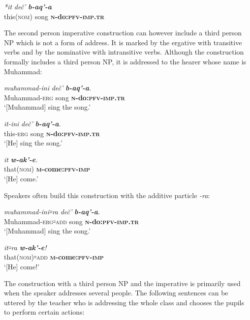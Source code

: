 ﻿\documentclass[output=paper]{langsci/langscibook}
\begin{document}
\ex %
\gll  \emph{*it}  \emph{deč'}  \emph{\textbf{b-aq'-a}}\\
 this(\textsc{nom})  song  \textbf{\textsc{n}-do:\textsc{pfv}-\textsc{imp}.\textsc{tr}}\\
\z
 
The second person imperative construction can however include a third
person {NP} which is not a form of address. It is marked by the ergative
with transitive verbs and by the nominative with intransitive verbs.
Although the construction formally includes a third person {NP}, it is
addressed to the hearer whose name is Muhammad:

\ea %
\gll  \emph{muħammad-ini}  \emph{deč'}  \emph{\textbf{b-aq'-a}.}\\
 Muhammad-\textsc{erg}  song  \textbf{\textsc{n}-do:\textsc{pfv}-\textsc{imp}.\textsc{tr}}\\
\glt `[Muhammad] sing the song.'

\ex %
\gll  \emph{it-ini}  \emph{deč'} \emph{\textbf{b-aq'-a}.}\\
 this-\textsc{erg}  song  \textbf{\textsc{n}-do:\textsc{pfv}-\textsc{imp}.\textsc{tr}}\\
\glt `[He] sing the song.'

\ex %
\gll  \emph{it}  \emph{\textbf{w-ak'-e}.}\\
 that(\textsc{nom})  \textbf{\textsc{m}-come:\textsc{pfv}-\textsc{imp}}\\
\glt `[He] come.'
\z

Speakers often build this construction with the additive particle
\emph{-ra}:

\ea %
\gll  \emph{muħammad-ini꞊ra}  \emph{deč'}  \emph{\textbf{b-aq'-a}.}\\
 Muhammad-\textsc{erg}꞊\textsc{add}  song  \textbf{\textsc{n}-do:\textsc{pfv}-\textsc{imp}.\textsc{tr}}\\
\glt `[Muhammad] sing the song.'

\ex %
\gll  \emph{it꞊ra}  \emph{\textbf{w-ak'-e}!} \\
 that(\textsc{nom})꞊\textsc{add}  \textbf{\textsc{m}-come:\textsc{pfv}-\textsc{imp}} \\
\glt `[He] come!'
\z

The construction with a third person {NP} and the imperative is primarily
used when the speaker addresses several people. The following sentences
can be uttered by the teacher who is addressing the whole class and
chooses the pupils to perform certain actions:
\end{document}
